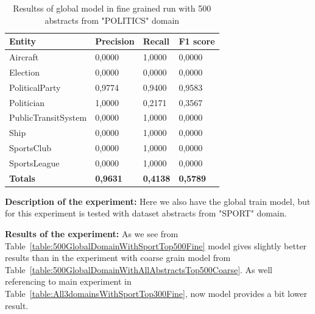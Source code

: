 \documentclass[thesis=M,english]{FITthesis}[2018/05/30]
\begin{document}
	\begin{table}[H]\centering
		\begin{tabular}{|l|l|l|l|}
			\hline {\textbf{Entity}} & {\textbf{Precision}} & {\textbf{Recall}} & {\textbf{F1 score}}\\\hline
				Aircraft & 0,0000 & 1,0000 & 0,0000\\				
				Election & 0,0000 & 0,0000 & 0,0000\\
				PoliticalParty & 0,9774 & 0,9400 & 0,9583\\
				Politician & 1,0000 & 0,2171 & 0,3567\\
				PublicTransitSystem & 0,0000 & 1,0000 & 0,0000\\
				Ship & 0,0000 & 1,0000 & 0,0000\\
				SportsClub & 0,0000 & 1,0000 & 0,0000\\
				SportsLeague & 0,0000 & 1,0000 & 0,0000\\\hline
				\textbf{Totals} & \textbf{0,9631} & \textbf{0,4138} & \textbf{0,5789}\\\hline
		\end{tabular}
		\caption{Resultss of global model in fine grained run with 500 abstracts from "POLITICS" domain \label{table:500GlobalDomainWithPoliticsTop500Fine}}
	\end{table}	

	\textbf{Description of the experiment:} Here we also have the global train model, but for this experiment is tested with dataset abstracts from "SPORT" domain.

	\textbf{Results of the experiment:} As we see from Table~\ref{table:500GlobalDomainWithSportTop500Fine} model gives slightly better results than in the experiment with coarse grain model from Table~\ref{table:500GlobalDomainWithAllAbstractsTop500Coarse}. As well referencing to main experiment in Table~\ref{table:All3domainsWithSportTop300Fine}, now model provides a bit lower result.
\end{document}

